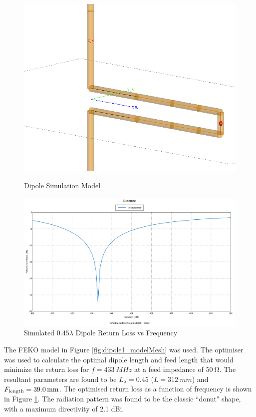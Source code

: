 \begin{figure}[!htb]
  \begin{minipage}{.38\textwidth}
    \centering
    \includegraphics[width=0.8\linewidth]{dipole1_modelMesh}
    \caption{Dipole Simulation Model}
    \label{fig:dipole1_modelMesh}
  \end{minipage}
  \begin{minipage}{.6\textwidth}
    \centering
    \includegraphics[width=0.95\linewidth]{dipole1_returnLoss}
    \caption{Simulated $0.45 \lambda$ Dipole Return Loss vs Frequency}
    \label{fig:dipole1_returnLoss}
  \end{minipage}
\end{figure}

The FEKO model in Figure \ref{fig:dipole1_modelMesh} was used. The optimiser was used to calculate the optimal dipole length and feed length that would minimize the return loss for $f = \SI{433}{MHz}$ at a feed impedance of $\SI{50}{\ohm}$. The resultant parameters are found to be $L_\lambda = 0.45$ ($L = \SI{312}{mm}$) and $F_{\textnormal{length}} = \SI{39.0}{mm}$. The optimised return loss as a function of frequency is shown in Figure \ref{fig:dipole1_returnLoss}. The radiation pattern was found to be the classic ``donut" shape, with a maximum directivity of 2.1 dBi.